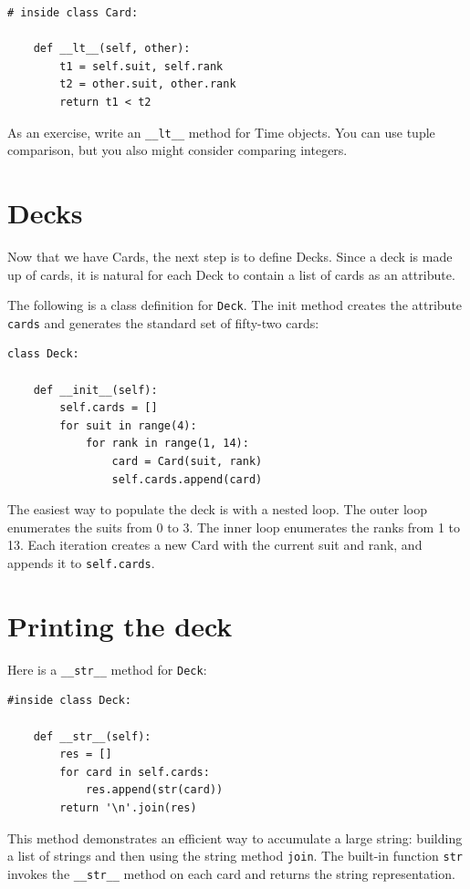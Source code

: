 \documentclass[10pt]{book}
\begin{document}
\begin{verbatim}
# inside class Card:

    def __lt__(self, other):
        t1 = self.suit, self.rank
        t2 = other.suit, other.rank
        return t1 < t2
\end{verbatim}
%
As an exercise, write an \verb"__lt__" method for Time objects.  You
can use tuple comparison, but you also might consider 
comparing integers.


\section{Decks}

Now that we have Cards, the next step is to define Decks.  Since a
deck is made up of cards, it is natural for each Deck to contain a
list of cards as an attribute.

The following is a class definition for {\tt Deck}.  The
init method creates the attribute {\tt cards} and generates
the standard set of fifty-two cards:

\begin{verbatim}
class Deck:

    def __init__(self):
        self.cards = []
        for suit in range(4):
            for rank in range(1, 14):
                card = Card(suit, rank)
                self.cards.append(card)
\end{verbatim}
%
The easiest way to populate the deck is with a nested loop.  The outer
loop enumerates the suits from 0 to 3.  The inner loop enumerates the
ranks from 1 to 13.  Each iteration
creates a new Card with the current suit and rank,
and appends it to {\tt self.cards}.


\section{Printing the deck}
\label{printdeck}

Here is a \verb"__str__" method for {\tt Deck}:

\begin{verbatim}
#inside class Deck:

    def __str__(self):
        res = []
        for card in self.cards:
            res.append(str(card))
        return '\n'.join(res)
\end{verbatim}
%
This method demonstrates an efficient way to accumulate a large
string: building a list of strings and then using the string method
{\tt join}.  The built-in function {\tt str} invokes the
\verb"__str__" method on each card and returns the string
representation.   
  
\end{document}
